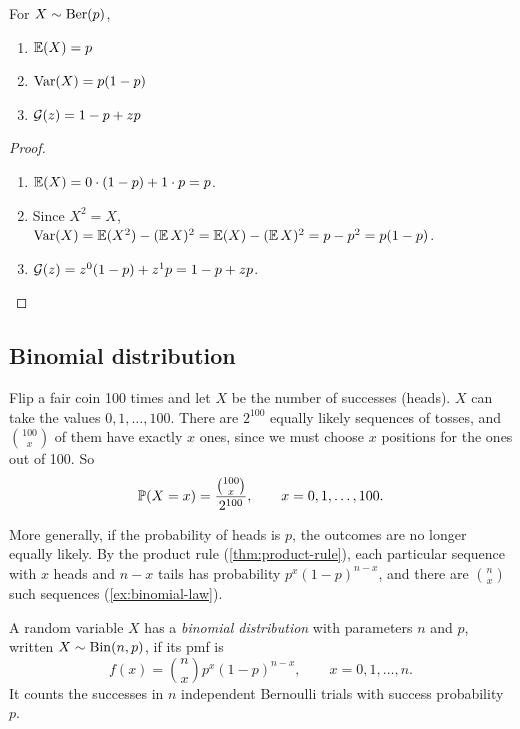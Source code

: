 \begin{theorem}\label{thm:bernoulli-properties}
For $X \sim \mathrm{Ber}(p)$,
\begin{enumerate}
  \item $\operatorname{\mathbb{E}}(X) = p$
  \item $\operatorname{Var}(X) = p(1-p)$
  \item $\mathcal{G}(z) = 1 - p + zp$
\end{enumerate}
\end{theorem}

\begin{proof}\leavevmode
\begin{enumerate}[leftmargin=*]
  \item[1.] $\operatorname{\mathbb{E}}(X) = 0 \cdot (1-p) + 1 \cdot p = p$.
  \item[2.] Since $X^2 = X$, $\operatorname{Var}(X) = \operatorname{\mathbb{E}}(X^2) - (\operatorname{\mathbb{E}} X)^2 = \operatorname{\mathbb{E}}(X) - (\operatorname{\mathbb{E}} X)^2 = p - p^2 = p(1-p)$.
  \item[3.] $\mathcal{G}(z) = z^0 (1-p) + z^1 p = 1 - p + zp$. \qedhere
\end{enumerate}
\end{proof}

\subsection{Binomial distribution}\label{sec:binomial}

Flip a fair coin 100 times and let $X$ be the number of successes (heads). $X$ can take the values $0, 1, \ldots, 100$. There are $2^{100}$ equally likely sequences of tosses, and $\binom{100}{x}$ of them have exactly $x$ ones, since we must choose $x$ positions for the ones out of 100. So
\[
  \mathbb{P}(X = x) = \frac{\binom{100}{x}}{2^{100}}, \qquad x = 0, 1, \ldots, 100.
\]

More generally, if the probability of heads is $p$, the outcomes are no longer equally likely. By the product rule (\cref{thm:product-rule}), each particular sequence with $x$ heads and $n - x$ tails has probability $p^x (1-p)^{n-x}$, and there are $\binom{n}{x}$ such sequences (\cref{ex:binomial-law}).

\begin{definition}\label{def:binomial}
A random variable $X$ has a \emph{binomial distribution} with parameters $n$ and $p$, written $X \sim \mathrm{Bin}(n, p)$, if its pmf is
\[
  f(x) = \binom{n}{x} p^x (1-p)^{n-x}, \qquad x = 0, 1, \ldots, n.
\]
It counts the successes in $n$ independent Bernoulli trials with success probability $p$.
\end{definition}


